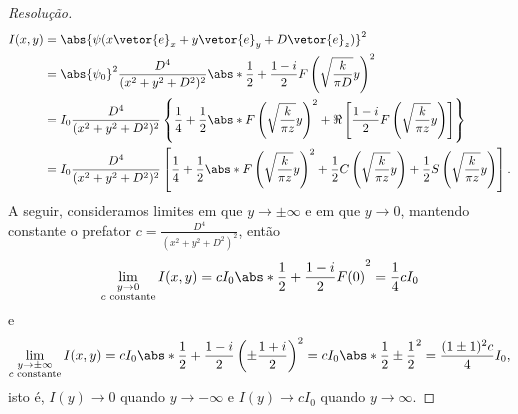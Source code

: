 \begin{proof}[Resolução]
    \begin{align*}
        I(x,y) &= \abs{\psi(x\vetor{e}_x + y\vetor{e}_y + D \vetor{e}_z)}^2\\
               &= \abs{\psi_0}^2 \frac{D^4}{(x^2 + y^2 + D^2)^2} \abs*{\frac12 + \frac{1 - i}{2} F\left(\sqrt{\frac{k}{\pi D}} y\right)}^2\\
               &= I_0 \frac{D^4}{(x^2 + y^2 + D^2)^2} \left\{\frac14 + \frac12\abs*{F\left(\sqrt{\frac{k}{\pi z}} y\right)}^2 + \Re\left[\frac{1 - i}{2} F\left(\sqrt{\frac{k}{\pi z}} y\right)\right]\right\}\\
               &= I_0 \frac{D^4}{(x^2 + y^2 + D^2)^2} \left[\frac14 + \frac12\abs*{F\left(\sqrt{\frac{k}{\pi z}} y\right)}^2 + \frac12 C\left(\sqrt{\frac{k}{\pi z}} y\right) + \frac12 S\left(\sqrt{\frac{k}{\pi z}} y\right)\right].
    \end{align*}
    A seguir, consideramos limites em que \(y \to \pm \infty\) e em que \(y \to 0\), mantendo constante o prefator \(c = \frac{D^4}{(x^2 + y^2 + D^2)^2}\), então 
    \begin{equation*}
        \lim_{\substack{y \to 0\\c\text{ constante}}}{I(x,y)} = c I_0 \abs*{\frac12 + \frac{1 - i}{2} F(0)}^2 = \frac14 cI_0
    \end{equation*}
    e
    \begin{equation*}
        \lim_{\substack{y \to \pm \infty\\c \text{ constante}}} I(x,y) = c I_0 \abs*{\frac12 + \frac{1 - i}{2} \left(\pm \frac{1 + i}{2}\right)}^2 = c I_0 \abs*{\frac12 \pm \frac12}^2 = \frac{(1 \pm 1)^2 c}{4}I_0,
    \end{equation*}
    isto é, \(I(y) \to 0\) quando \(y \to -\infty\) e \(I(y) \to c I_0\) quando \(y \to \infty.\)
\end{proof}
